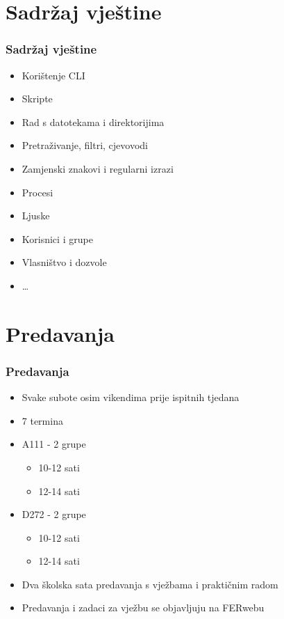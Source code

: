 \documentclass{beamer}
\begin{document}
\section{Sadržaj vještine}
\begin{frame}[t]
	\frametitle{Sadržaj vještine}
	\begin{itemize}
		\item Korištenje CLI
		\item Skripte
		\item Rad s datotekama i direktorijima
		\item Pretraživanje, filtri, cjevovodi
		\item Zamjenski znakovi i regularni izrazi
		\item Procesi
		\item Ljuske
		\item Korisnici i grupe
		\item Vlasništvo i dozvole
		\item \ldots
	\end{itemize}
\end{frame}

\section{Predavanja}
\begin{frame}[t]
\frametitle{Predavanja}
\begin{itemize}
	\item Svake subote osim vikendima prije ispitnih tjedana
	\item 7 termina
	\item A111 - 2 grupe
	\begin{itemize}
		\item 10-12 sati
		\item 12-14 sati
	\end{itemize}
	\item D272 - 2 grupe
	\begin{itemize}
		\item 10-12 sati
		\item 12-14 sati
	\end{itemize}
	\item Dva školska sata predavanja s vježbama i praktičnim radom
	\item Predavanja i zadaci za vježbu se objavljuju na FERwebu
\end{itemize}
\end{frame}
\end{document}
